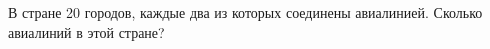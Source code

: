 \question 
В стране 20 городов, каждые два из которых соединены авиалинией. Сколько авиалиний в этой стране?
